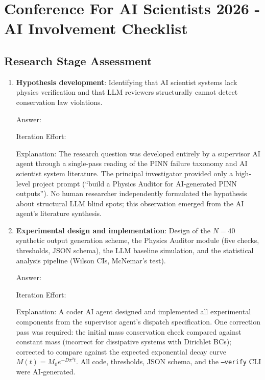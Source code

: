 \documentclass{article}
\begin{document}
\newpage

\section*{Conference For AI Scientists 2026 - AI Involvement Checklist}
\label{checklist_ai_involvement}

\subsection*{Research Stage Assessment}

\begin{enumerate}

\item \textbf{Hypothesis development}: Identifying that AI scientist systems
  lack physics verification and that LLM reviewers structurally cannot detect
  conservation law violations.

  Answer: \involvementD{}

  Iteration Effort: \iterationLow{}

  Explanation: The research question was developed entirely by a supervisor AI
  agent through a single-pass reading of the PINN failure taxonomy and AI
  scientist system literature. The principal investigator provided only a
  high-level project prompt (``build a Physics Auditor for AI-generated PINN
  outputs''). No human researcher independently formulated the hypothesis about
  structural LLM blind spots; this observation emerged from the AI agent's
  literature synthesis.

\item \textbf{Experimental design and implementation}: Design of the $N=40$
  synthetic output generation scheme, the Physics Auditor module (five checks,
  thresholds, JSON schema), the LLM baseline simulation, and the statistical
  analysis pipeline (Wilson CIs, McNemar's test).

  Answer: \involvementD{}

  Iteration Effort: \iterationLow{}

  Explanation: A coder AI agent designed and implemented all experimental
  components from the supervisor agent's dispatch specification. One correction
  pass was required: the initial mass conservation check compared against
  constant mass (incorrect for dissipative systems with Dirichlet BCs);
  corrected to compare against the expected exponential decay curve
  $M(t) = M_0 e^{-D\pi^2 t}$. All code, thresholds, JSON schema, and the
  \texttt{--verify} CLI were AI-generated.


\end{enumerate}
\end{document}

